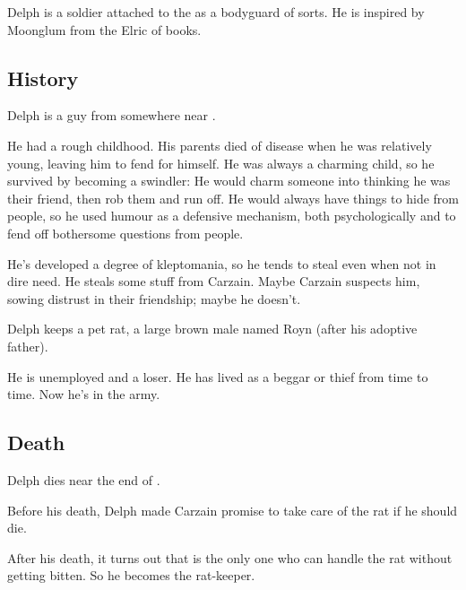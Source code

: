 Delph is a soldier attached to the \ishrah{} as a bodyguard of sorts. He is inspired by Moonglum from the Elric of \Melnibone{} books. 







\subsection{History}
Delph is a \Tepharin{} guy from somewhere near \Malcur. 

He had a rough childhood. His parents died of disease when he was relatively young, leaving him to fend for himself. He was always a charming child, so he survived by becoming a swindler: He would charm someone into thinking he was their friend, then rob them and run off. He would always have things to hide from people, so he used humour as a defensive mechanism, both psychologically and to fend off bothersome questions from people. 

He's developed a degree of kleptomania, so he tends to steal even when not in dire need. He steals some stuff from Carzain. Maybe Carzain suspects him, sowing distrust in their friendship; maybe he doesn't. 

Delph keeps a pet rat, a large brown male named Royn (after his adoptive father). 

He is unemployed and a loser. 
He has lived as a beggar or thief from time to time. 
Now he's in the army. 







\subsection{Death}
Delph dies near the end of \emph{\TwilightAngelRemember{}}. 

Before his death, Delph made Carzain promise to take care of the rat if he should die. 

After his death, it turns out that  is the only one who can handle the rat without getting bitten. So he becomes the rat-keeper. 
















